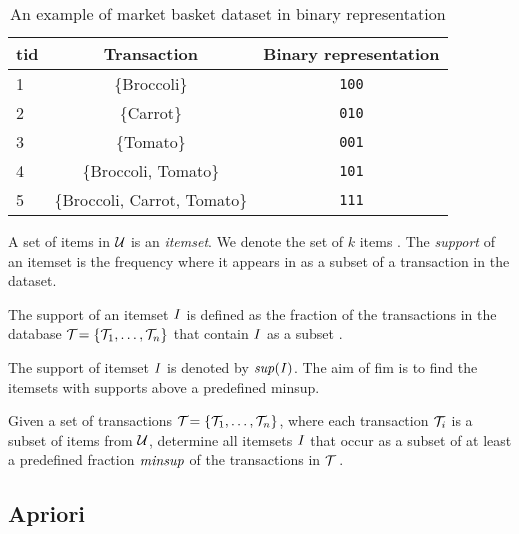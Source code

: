\begin{table}[tb]
    \centering
    \begin{tabular}{|l|c|c|}
        \hline
        \textbf{\ac{tid}} & \textbf{Transaction}         & \textbf{Binary representation} \\ \hline
        1            & \{Broccoli\}                 & \texttt{100}                   \\ \hline
        2            & \{Carrot\}                   & \texttt{010}                   \\ \hline
        3            & \{Tomato\}                   & \texttt{001}                   \\ \hline
        4            & \{Broccoli, Tomato\}         & \texttt{101}                   \\ \hline
        5            & \{Broccoli, Carrot, Tomato\} & \texttt{111}                   \\ \hline
    \end{tabular}
    \caption{An example of market basket dataset in binary representation}
    \label{tab:market-basket-dataset}
\end{table}

A set of items in $\mathcal{U}$ is an \textit{itemset}. We denote the set of $k$ items \kItemset.
The \textit{support} of an itemset is the frequency where it appears in as a subset of a transaction in the dataset.

\begin{definition}[Support]
    The support of an itemset $\mathit{I}$ is defined as the fraction of the transactions in the database $\mathcal{T}_{} = \{\mathcal{T}_{1}, \dots, \mathcal{T}_{n}\}{}$ that contain $\mathit{I}$ as a subset \citep{Aggarwal15}.
\end{definition}

The support of itemset $\mathit{I}$ is denoted by $\mathit{sup({I})}$.
The aim of \acl{fim} is to find the itemsets with supports above a predefined \ac{minsup}.


\begin{definition}
    Given a set of transactions $\mathcal{T}_{} = \{\mathcal{T}_{1}, \dots, \mathcal{T}_{n}\}{}$, where each transaction $\mathcal{T}_{i}$ is a subset of items from $\mathcal{U}$, determine all itemsets $\mathit{I}$ that occur as a subset of at least a predefined fraction $\mathit{minsup}$ of the transactions in $\mathcal{T}_{}$ \citep{Aggarwal15}.
\end{definition}

\subsection{Apriori}
